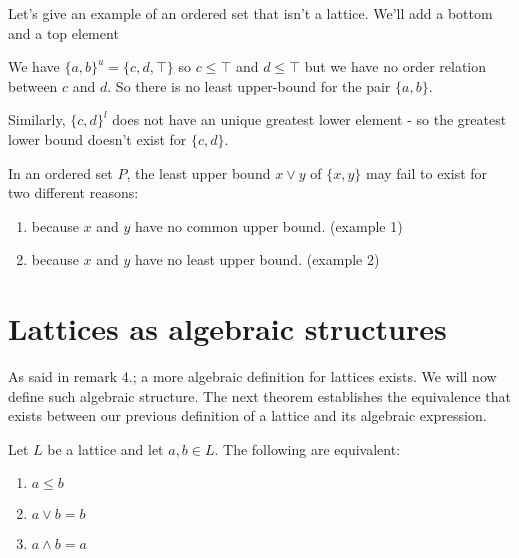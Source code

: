 \begin{example} Let's give an example of an ordered set that isn't a
lattice. We'll add a bottom and a top element

\begin{center}
\end{center}

We have $\{a,b\}^u = \{c,d,\top\}$ so $c \leq \top$ and $d \leq \top$ but we
have no order relation between $c$ and $d$. So there is no least upper-bound for
the pair $\{a,b\}$.

Similarly, $\{c,d\}^l$ does not have an unique greatest lower element - so the
greatest lower bound doesn't exist for $\{c,d\}$.
\end{example}

\begin{remark} In an ordered set $P$, the least upper bound $x \lor y$ of
$\{x,y\}$ may fail to exist for two different reasons:
\begin{enumerate}
\item because $x$ and $y$ have no common upper bound. (example 1)
\item because $x$ and $y$ have no least upper bound. (example 2)
\end{enumerate}
\end{remark}

\section{Lattices as algebraic structures}

As said in remark 4.; a more algebraic definition for lattices exists. We will
now define such algebraic structure. The next theorem establishes the
equivalence that exists between our previous definition of a lattice and its
algebraic expression.

\begin{lemma} Let $L$ be a lattice and let $a,b \in
L$. The following are equivalent:
	\begin{enumerate}
		\item $a \leq b$
		\item $ a \lor b = b$
		\item $a \land b = a$
	\end{enumerate}
\end{lemma}

